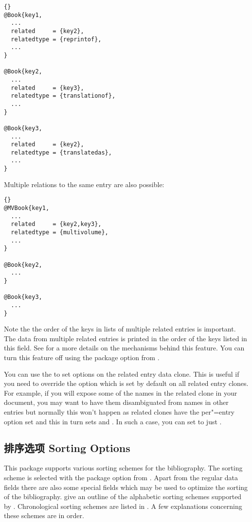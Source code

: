 \begin{lstlisting}[style=bibtex]{}
@Book{key1,
  ...
  related     = {key2},
  relatedtype = {reprintof},
  ...
}

@Book{key2,
  ...
  related     = {key3},
  relatedtype = {translationof},
  ...
}

@Book{key3,
  ...
  related     = {key2},
  relatedtype = {translatedas},
  ...
}
\end{lstlisting}
%
Multiple relations to the same entry are also possible:
\begin{lstlisting}[style=bibtex]{}
@MVBook{key1,
  ...
  related     = {key2,key3},
  relatedtype = {multivolume},
  ...
}

@Book{key2,
  ...
}

@Book{key3,
  ...
}
\end{lstlisting}
%
Note the the order of the keys in lists of multiple related entries is important. The data from multiple related entries is printed in the order of the keys listed in this field. See  for a more details on the mechanisms behind this feature. You can turn this feature off using the package option  from .

You can use the  to set options on the related entry data clone. This is useful if you need to override the  option which is set by default on all related entry clones. For example, if you will expose some of the names in the related clone in your document, you may want to have them disambiguated from names in other entries but normally this won't happen as related clones have the per"=entry  option set and this in turn sets  and . In such a case, you can set  to just .

\subsection{排序选项 Sorting Options}
\label{use:srt}

This package supports various sorting schemes for the bibliography. The sorting scheme is selected with the  package option from . Apart from the regular data fields there are also some special fields which may be used to optimize the sorting of the bibliography.  give an outline of the alphabetic sorting schemes supported by \biblatex. Chronological sorting schemes are listed in . A few explanations concerning these schemes are in order.

